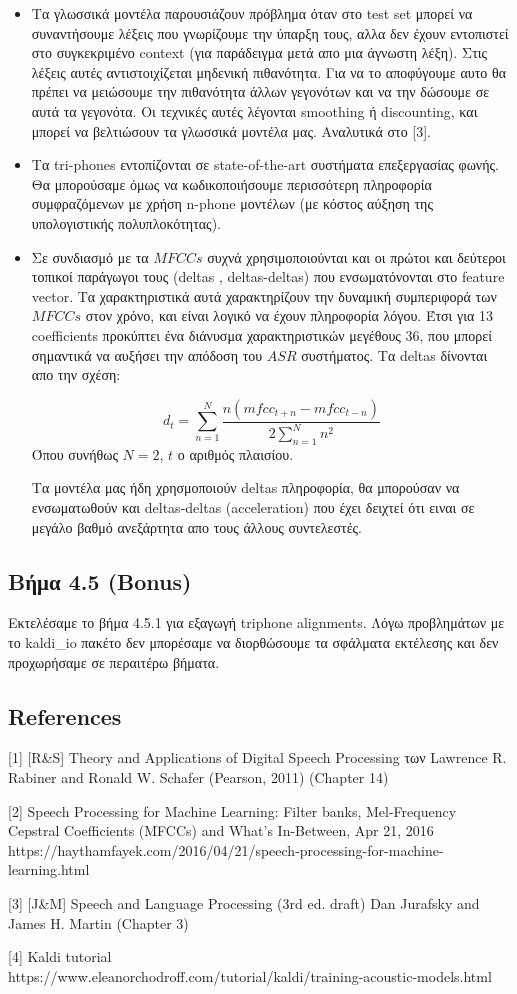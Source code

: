 \documentclass[12pt]{article}
\begin{document}
\begin{itemize}
    \item Τα γλωσσικά μοντέλα παρουσιάζουν πρόβλημα όταν στο test set μπορεί να συναντήσουμε λέξεις που γνωρίζουμε την ύπαρξη τους, αλλα δεν έχουν εντοπιστεί στο συγκεκριμένο context (για παράδειγμα μετά απο μια άγνωστη λέξη). Στις λέξεις αυτές αντιστοιχίζεται μηδενική πιθανότητα. Για να το αποφύγουμε αυτο θα πρέπει να μειώσουμε την πιθανότητα άλλων γεγονότων και να την δώσουμε σε αυτά τα γεγονότα. Οι τεχνικές αυτές λέγονται smoothing ή discounting, και μπορεί να βελτιώσουν τα γλωσσικά μοντέλα μας. Αναλυτικά στο [3].
    \item Τα tri-phones εντοπίζονται σε state-of-the-art συστήματα επεξεργασίας φωνής. Θα μπορούσαμε όμως να κωδικοποιήσουμε περισσότερη πληροφορία συμφραζόμενων με χρήση n-phone μοντέλων (με κόστος αύξηση της υπολογιστικής πολυπλοκότητας).
    \item Σε συνδιασμό με τα $MFCCs$ συχνά χρησιμοποιούνται και οι πρώτοι και δεύτεροι τοπικοί παράγωγοι τους (deltas , deltas-deltas) που ενσωματόνονται στο feature vector. Τα χαρακτηριστικά αυτά χαρακτηρίζουν την δυναμική συμπεριφορά  των $MFCCs$ στον χρόνο, και είναι λογικό να έχουν πληροφορία λόγου.  Έτσι για 13 coefficients προκύπτει ένα διάνυσμα χαρακτηριστικών μεγέθους 36, που μπορεί σημαντικά να αυξήσει την απόδοση του $ASR$ συστήματος. Τα deltas δίνονται απο την σχέση:
    
    $$d_t = \sum_{n=1}^N \frac{ n(mfcc_{t+n}-mfcc_{t-n})}{2\sum_{n=1}^N n^2}$$
    Όπου συνήθως $N=2$, $t$ ο αριθμός πλαισίου.
    
    Τα μοντέλα μας ήδη χρησμοποιούν deltas πληροφορία, θα μπορούσαν να ενσωματωθούν και deltas-deltas (acceleration) που έχει δειχτεί ότι ειναι σε μεγάλο βαθμό ανεξάρτητα απο τους άλλους συντελεστές. 
    
\end{itemize}

\subsection*{Βήμα 4.5 (Bonus)}
Εκτελέσαμε το βήμα 4.5.1 για εξαγωγή triphone alignments. Λόγω προβλημάτων με το kaldi\_io πακέτο δεν μπορέσαμε να διορθώσουμε τα σφάλματα εκτέλεσης και δεν προχωρήσαμε σε περαιτέρω βήματα. 


\subsection*{References}
[1] [R\&S] Theory and Applications of Digital Speech Processing
των Lawrence R. Rabiner and Ronald W. Schafer (Pearson, 2011) (Chapter 14)

[2] Speech Processing for Machine Learning: Filter banks, Mel-Frequency Cepstral Coefficients (MFCCs) and What's In-Between, Apr 21, 2016 \\
https://haythamfayek.com/2016/04/21/speech-processing-for-machine-learning.html

[3] [J\&M] Speech and Language Processing (3rd ed. draft) Dan Jurafsky and James H. Martin (Chapter 3)

[4] Kaldi tutorial \\ https://www.eleanorchodroff.com/tutorial/kaldi/training-acoustic-models.html
\end{document}
